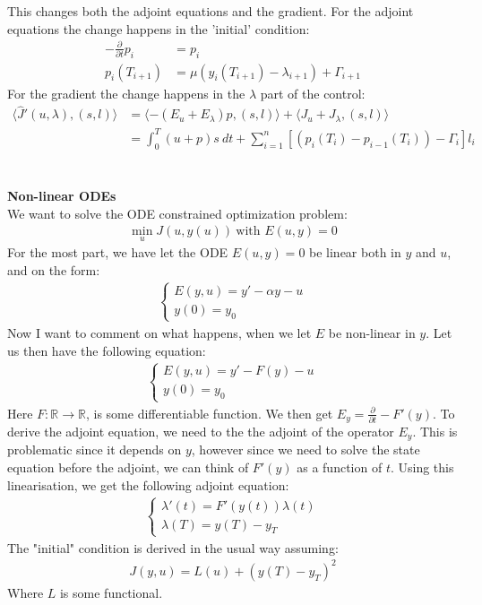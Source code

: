 \documentclass[11pt,a4paper]{report}
\begin{document}
This changes both the adjoint equations and the gradient. For the adjoint equations the change happens in the 'initial' condition:
\begin{align*}
-\frac{\partial }{\partial t}p_i &=p_i  \\
p_i(T_{i+1}) &= \mu(y_{i}(T_{i+1})-\lambda_{i+1} ) + \Gamma_{i+1}
\end{align*}
For the gradient the change happens in the $\lambda$ part of the control:
\begin{align*}
\langle \hat{J}'(u,\lambda), (s,l)\rangle&=\langle -(E_u+E_{\lambda})p, (s,l)\rangle + \langle J_u+J_{\lambda}, (s,l)\rangle \\
&= \int_0^T (u+p)s \ dt +\sum_{i=1}^n[(p_{i}(T_i) -p_{i-1}(T_i) )- \Gamma_i]l_i
\end{align*}
\\
\\
\textbf{Non-linear ODEs}
\\
We want to solve the ODE constrained optimization problem:
\begin{align*}
\min_{u}J(u,y(u)) \ \text{with } E(u,y)=0
\end{align*}
For the most part, we have let the ODE $E(u,y)=0$ be linear both in $y$ and $u$, and on the form:
\begin{align*}
\left\{
     \begin{array}{lr}
       	E(y,u) = y'-\alpha y -u\\
       	   y(0)=y_0
     \end{array}
   \right.
\end{align*} 
Now I want to comment on what happens, when we let $E$ be non-linear in $y$. Let us then have the following equation:
\begin{align*}
\left\{
     \begin{array}{lr}
       	E(y,u) = y'- F(y) -u\\
       	   y(0)=y_0
     \end{array}
   \right.
\end{align*} 
Here $F:\mathbb{R} \rightarrow \mathbb{R}$, is some differentiable function. We then get $E_y = \frac{\partial}{\partial t} - F'(y)$. To derive the adjoint equation, we need to the the adjoint of the operator $E_y$. This is problematic since it depends on $y$, however since we need to solve the state equation before the adjoint, we can think of $F'(y)$ as a function of $t$. Using this linearisation, we get the following adjoint equation: 
\begin{align*}
\left\{
     \begin{array}{lr}
       	\lambda'(t)=F'(y(t))\lambda(t)\\
       	   \lambda(T)= y(T)-y_T
     \end{array}
   \right.
\end{align*}
The "initial" condition is derived in the usual way assuming: 
\begin{align*}
J(y,u)=L(u) + (y(T)-y_T)^2
\end{align*}
Where $L$ is some functional.
\end{document}
